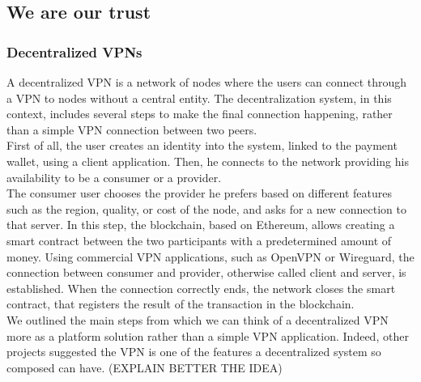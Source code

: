 \documentclass[]{article}
\begin{document}
	\subsection{We are our trust}
	
	\subsubsection{Decentralized VPNs}

	A decentralized VPN is a network of nodes where the users can connect through a VPN to nodes without a central entity. The decentralization system, in this context, includes several steps to make the final connection happening, rather than a simple VPN connection between two peers.\\
	First of all, the user creates an identity into the system, linked to the payment wallet, using a client application. Then, he connects to the network providing his availability to be a consumer or a provider.\\
	The consumer user chooses the provider he prefers based on different features such as the region, quality, or cost of the node, and asks for a new connection to that server. In this step, the blockchain, based on Ethereum, allows creating a smart contract between the two participants with a predetermined amount of money. Using commercial VPN applications, such as OpenVPN or Wireguard, the connection between consumer and provider, otherwise called client and server, is established. When the connection correctly ends, the network closes the smart contract, that registers the result of the transaction in the blockchain.\\
	We outlined the main steps from which we can think of a decentralized VPN more as a platform solution rather than a simple VPN application. Indeed, other projects suggested the VPN is one of the features a decentralized system so composed can have. (EXPLAIN BETTER THE IDEA)  
		          
\end{document}
